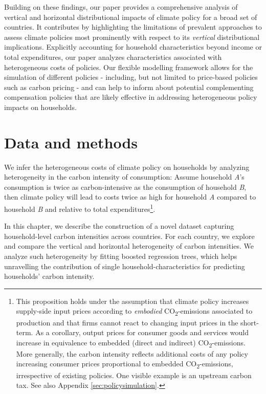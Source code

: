 \documentclass[12pt, a4paper]{article}
\begin{document}
Building on these findings, our paper provides a comprehensive analysis of vertical and horizontal distributional impacts of climate policy for a broad set of countries. It contributes by highlighting the limitations of prevalent approaches to assess climate policies most prominently with respect to its \textit{vertical} distributional implications. Explicitly accounting for household characteristics beyond income or total expenditures, our paper analyzes characteristics associated with heterogeneous costs of policies. Our flexible modelling framework allows for the simulation of different policies - including, but not limited to price-based policies such as carbon pricing - and can help to inform about potential complementing compensation policies that are likely effective in addressing heterogeneous policy impacts on households.

\section{Data and methods} \label{sec:data_methods}

We infer the heterogeneous costs of climate policy on households by analyzing heterogeneity in the carbon intensity of consumption: Assume household \textit{A}'s consumption is twice as carbon-intensive as the consumption of household \textit{B}, then climate policy will lead to costs twice as high for household \textit{A} compared to household \textit{B} and relative to total expenditures\footnote{This proposition holds under the assumption that climate policy increases supply-side input prices according to \textit{embodied} CO\textsubscript{2}-emissions associated to production and that firms cannot react to changing input prices in the short-term. As a corollary, output prices for consumer goods and services would increase in equivalence to embedded (direct and indirect) CO\textsubscript{2}-emissions. More generally, the carbon intensity reflects additional costs of any policy increasing consumer prices proportional to embedded CO\textsubscript{2}-emissions, irrespective of existing policies. One visible example is an upstream carbon tax. See also Appendix \ref{sec:policysimulation}.}.

In this chapter, we describe the construction of a novel dataset capturing household-level carbon intensities across countries. For each country, we explore and compare the vertical and horizontal heterogeneity of carbon intensities. We analyze such heterogeneity by fitting boosted regression trees, which helps unravelling the contribution of single household-characteristics for predicting households' carbon intensity.
\end{document}
